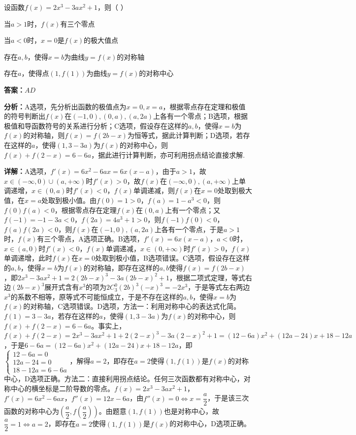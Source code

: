\begin{question}[points=6]
设函数$f(x)=2x^3-3ax^2+1$，则（ ）
\begin{choices}
  \item 当$a>1$时，$f(x)$有三个零点
  \item 当$a<0$时，$x=0$是$f(x)$的极大值点
  \item 存在$a,b$，使得$x=b$为曲线$y=f(x)$的对称轴
  \item 存在$a$，使得点$(1,f(1))$为曲线$y=f(x)$的对称中心
\end{choices}
\begin{solution}
\textbf{答案：}$AD$

\textbf{分析：}A选项，先分析出函数的极值点为$x=0,x=a$，根据零点存在定理和极值的符号判断出$f(x)$在$(-1,0),(0,a),(a,2a)$上各有一个零点；B选项，根据极值和导函数符号的关系进行分析；C选项，假设存在这样的$a,b$，使得$x=b$为$f(x)$的对称轴，则$f(x)=f(2b-x)$为恒等式，据此计算判断；D选项，若存在这样的$a$，使得$(1,3-3a)$为$f(x)$的对称中心，则$f(x)+f(2-x)=6-6a$，据此进行计算判断，亦可利用拐点结论直接求解.

\textbf{详解：}A选项，$f'(x)=6x^2-6ax=6x(x-a)$，由于$a>1$，故$x\in(-\infty,0)\cup(a,+\infty)$时$f'(x)>0$，故$f(x)$在$(-\infty,0),(a,+\infty)$上单调递增，$x\in(0,a)$时$f'(x)<0$，$f(x)$单调递减，则$f(x)$在$x=0$处取到极大值，在$x=a$处取到极小值。由$f(0)=1>0$，$f(a)=1-a^3<0$，则$f(0)f(a)<0$，根据零点存在定理$f(x)$在$(0,a)$上有一个零点；又$f(-1)=-1-3a<0$，$f(2a)=4a^3+1>0$，则$f(-1)f(0)<0$，$f(a)f(2a)<0$，则$f(x)$在$(-1,0),(a,2a)$上各有一个零点，于是$a>1$时，$f(x)$有三个零点，A选项正确。B选项，$f'(x)=6x(x-a)$，$a<0$时，$x\in(a,0)$时$f'(x)<0$，$f(x)$单调递减，$x\in(0,+\infty)$时$f'(x)>0$，$f(x)$单调递增，此时$f(x)$在$x=0$处取到极小值，B选项错误。C选项，假设存在这样的$a,b$，使得$x=b$为$f(x)$的对称轴，即存在这样的$a,b$使得$f(x)=f(2b-x)$，即$2x^3-3ax^2+1=2(2b-x)^3-3a(2b-x)^2+1$，根据二项式定理，等式右边$(2b-x)^3$展开式含有$x^3$的项为$2C_3^0(2b)^3(-x)^3=-2x^3$，于是等式左右两边$x^3$的系数不相等，原等式不可能恒成立，于是不存在这样的$a,b$，使得$x=b$为$f(x)$的对称轴，C选项错误。D选项，方法一：利用对称中心的表达式化简。$f(1)=3-3a$，若存在这样的$a$，使得$(1,3-3a)$为$f(x)$的对称中心，则$f(x)+f(2-x)=6-6a$。事实上，$f(x)+f(2-x)=2x^3-3ax^2+1+2(2-x)^3-3a(2-x)^2+1=(12-6a)x^2+(12a-24)x+18-12a$，于是$6-6a=(12-6a)x^2+(12a-24)x+18-12a$，即$\begin{cases}12-6a=0\\12a-24=0\\18-12a=6-6a\end{cases}$，解得$a=2$，即存在$a=2$使得$(1,f(1))$是$f(x)$的对称中心，D选项正确。方法二：直接利用拐点结论。任何三次函数都有对称中心，对称中心的横坐标是二阶导数的零点。$f(x)=2x^3-3ax^2+1$，$f'(x)=6x^2-6ax$，$f''(x)=12x-6a$，由$f''(x)=0\Leftrightarrow x=\dfrac{a}{2}$，于是该三次函数的对称中心为$\left(\dfrac{a}{2},f\left(\dfrac{a}{2}\right)\right)$。由题意$(1,f(1))$也是对称中心，故$\dfrac{a}{2}=1\Leftrightarrow a=2$，即存在$a=2$使得$(1,f(1))$是$f(x)$的对称中心，D选项正确。
\end{solution}
\end{question}

